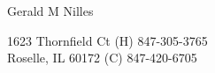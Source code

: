 \documentclass[12pt, letterpaper]{minimal}
\begin{document}

\newcommand{\huge}{\fontsize{24.88}{15}\selectfont}
\newcommand{\large}{\fontsize{17.28}{15}\selectfont}
\newcommand{\normal}{\fontsize{12}{15}\selectfont}


\newcommand{\myname}[1]{{\huge \noindent \begin{center} #1  \end{center}}}
\newcommand{\myhead}[1]{{ \large \noindent \vspace{0.5cm} #1 } }
\newcommand{\company}[1]{{ \noindent \vspace{0.2cm} \hspace*{0.5cm} \textbf{#1} }}
\newcommand{\position}[2]{{ \noindent \hspace*{0.7cm} \emph{#1} \hfill #2 }}
\newenvironment{skills}{\begin{list}{ $\circ$ \hspace{0.1cm}}{\setlength\leftmargin{1.5cm} \setlength\itemindent{-0.6cm}}  }{\end{list}}
\newcommand{\skill}[1]{ \item #1 }

\myname{Gerald M Nilles}
1623 Thornfield Ct  \hfill (H) 847-305-3765 \\
Roselle, IL 60172   \hfill (C) 847-420-6705 \\
\end{document}
